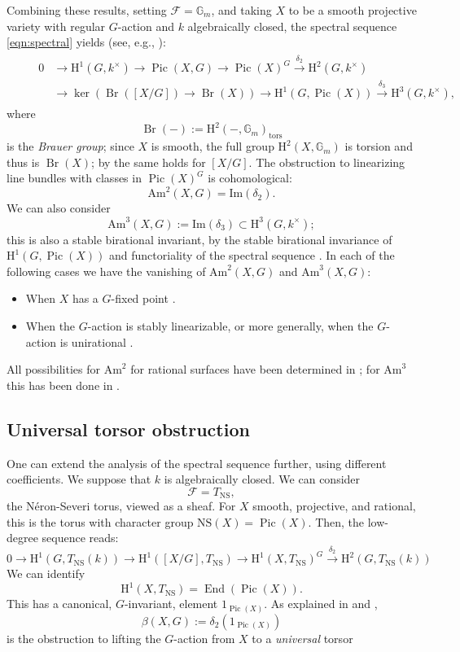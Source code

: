 \documentclass[12pt,reqno]{amsart}
\theoremstyle{plain}
\theoremstyle{remark}
\theoremstyle{definition}
\numberwithin{equation}{section}
\newcommand{\cF}{{\mathcal F}}
\newcommand{\rH}{{\mathrm H}}
\newcommand{\lra}{\longrightarrow}
\newcommand{\bG}{{\mathbb G}}
\newcommand{\Am}{\mathrm{Am}}
\DeclareMathOperator{\Pic}{Pic}
\DeclareMathOperator{\End}{End}
\DeclareMathOperator{\Br}{Br}
\begin{document}
Combining these results, setting $\cF=\bG_m$, and taking $X$ to be a smooth projective variety with regular $G$-action and $k$ algebraically closed, the spectral sequence \eqref{eqn:spectral} 
yields (see, e.g., \cite[Sect.\ 3]{KT-dp}):
\begin{align}
\begin{split}
\label{eqn.BrXmodG}
\qquad 0&\to  \rH^1(G,k^\times)\to \Pic(X,G)\to 
\Pic(X)^G \stackrel{\delta_2}{\lra}  \rH^2(G,k^\times)\\
&\stackrel{}{\lra} \ker(\Br([X/G])\to \Br(X))\to\rH^1(G,\Pic(X))\stackrel{\delta_3}{\lra}  \rH^3(G,k^\times), 
\end{split}
\end{align}
where 
$$
\Br(-) :=\rH^2(-, \bG_m)_{\mathrm{tors}}
$$
is the {\em Brauer group}; since $X$ is smooth, the full group $\rH^2(X,\bG_m)$ is torsion and thus is $\Br(X)$; by \cite[Prop.\ 2.5 (iii)]{ant} the same holds for $[X/G]$.
The obstruction to linearizing line bundles with classes in $\Pic(X)^G$ is cohomological:
$$
\Am^2(X,G)=\mathrm{Im}(\delta_2). 
$$
We can also consider 
$$
\Am^3(X,G):=\mathrm{Im}(\delta_3)\subset \rH^3(G,k^\times); 
$$
this is also a stable birational invariant,
by the stable birational invariance of $\rH^1(G,\Pic(X))$ and
functoriality of the spectral sequence
\cite[Sect.\ 3]{KT-dp}. 
In each of the following cases we have the vanishing of $\Am^2(X,G)$ and $\Am^3(X,G)$:
\begin{itemize}
\item When $X$ has a $G$-fixed point \cite[Sect.\ 3]{KT-dp}.
\item When the $G$-action is stably linearizable, or more generally, when the $G$-action is unirational \cite[Sect.\ 2]{KT-uni}.
\end{itemize}

All possibilities for $\Am^2$ for rational surfaces have been determined in \cite[Prop. 6.7]{blancfinite}; for $\Am^3$ this 
has been done in \cite{TZ-uni}.

\subsection*{Universal torsor obstruction}
One can extend the analysis of the spectral sequence further, using different coefficients.
We suppose that $k$ is algebraically closed.
We can consider
$$
\cF=T_{\mathrm{NS}},
$$
the N\'eron-Severi torus, viewed as a sheaf. 
For $X$ smooth, projective, and rational, 
this is the torus with character group $\mathrm{NS}(X)=\Pic(X).$
Then, the low-degree sequence reads:
$$
0\to  \rH^1(G,T_{\mathrm{NS}}(k))\to \rH^1([X/G],T_{\mathrm{NS}})\to 
\rH^1(X,T_{\mathrm{NS}})^G \stackrel{\delta_2}{\lra}  \rH^2(G,T_{\mathrm{NS}}(k))
$$
We can identify
\begin{equation} \label{eqn:ident}
\rH^1(X,T_{\mathrm{NS}}) = \End(\Pic(X)). 
\end{equation}
This has a canonical, $G$-invariant, element $1_{\Pic(X)}$. 
As explained in \cite{HTtors} and \cite[Sect. 5]{KT-uni}, 
$$
\beta(X,G):=\delta_2(1_{\Pic(X)})
$$
is the obstruction to lifting the $G$-action from $X$ to a {\em universal} torsor 
\end{document}
